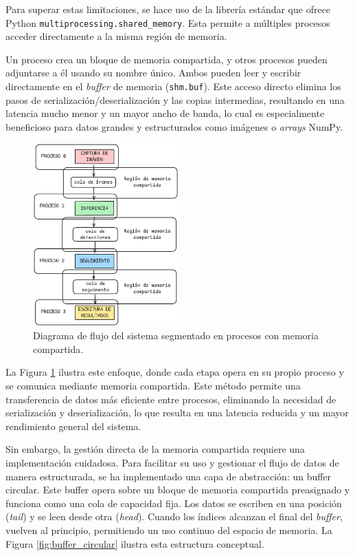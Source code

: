 \documentclass[11pt,spanish,listoffigures,listoftables]{tfgetsinf}
\begin{document}
Para superar estas limitaciones, se hace uso de la librería estándar que ofrece Python \texttt{multiprocessing.shared\_memory}\cite{multiprocessing_shared_memory}. Esta permite a múltiples procesos acceder directamente a la misma región de memoria. 

Un proceso crea un bloque de memoria compartida, y otros procesos pueden adjuntarse a él usando su nombre único. Ambos pueden leer y escribir directamente en el \textit{buffer} de memoria (\texttt{shm.buf}). Este acceso directo elimina los pasos de serialización/deserialización y las copias intermedias, resultando en una latencia mucho menor y un mayor ancho de banda, lo cual es especialmente beneficioso para datos grandes y estructurados como imágenes o \textit{arrays} NumPy.


\begin{figure}[H]
   \centering
   \includegraphics[width=0.5\textwidth]{images/diseno_e_implementacion/segmentacion_procesos_memoria_compartida.png}
   \caption[Diagrama de flujo del sistema segmentado en procesos con memoria compartida]{Diagrama de flujo del sistema segmentado en procesos con memoria compartida.}
   \label{fig:segmentacion_procesos_memoria_compartida}
\end{figure}

La Figura \ref{fig:segmentacion_procesos_memoria_compartida} ilustra este enfoque, donde cada etapa opera en su propio proceso y se comunica mediante memoria compartida. Este método permite una transferencia de datos más eficiente entre procesos, eliminando la necesidad de serialización y deserialización, lo que resulta en una latencia reducida y un mayor rendimiento general del sistema.


Sin embargo, la gestión directa de la memoria compartida requiere una implementación cuidadosa. Para facilitar su uso y gestionar el flujo de datos de manera estructurada, se ha implementado una capa de abstracción: un buffer circular. Este buffer opera sobre un bloque de memoria compartida preasignado y funciona como una cola de capacidad fija. Los datos se escriben en una posición (\textit{tail}) y se leen desde otra (\textit{head}). Cuando los índices alcanzan el final del \textit{buffer}, vuelven al principio, permitiendo un uso continuo del espacio de memoria. La Figura \ref{fig:buffer_circular} ilustra esta estructura conceptual.
\end{document}

